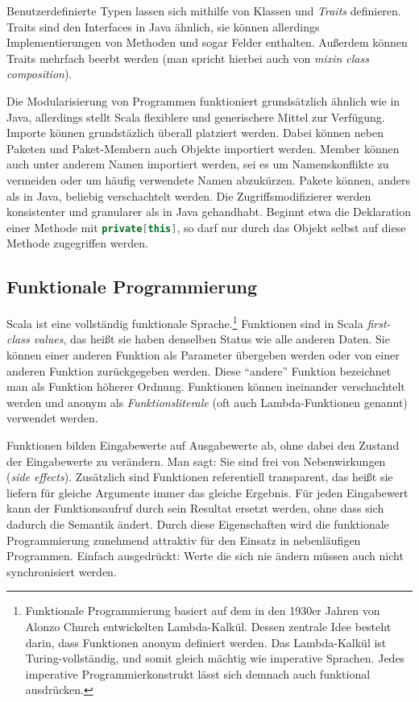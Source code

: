 \documentclass[a4paper, 12pt, hidelinks, listof=totoc, listoftables=totoc, bibliography=totoc]{scrreprt}
\newcommand{\scala}[1]{\lstinline[language=Scala, style=inline]|#1|}
\begin{document}
Benutzerdefinierte Typen lassen sich mithilfe von Klassen und \textit{Traits} definieren. Traits sind den Interfaces in Java ähnlich, sie können allerdings Implementierungen von Methoden und sogar Felder enthalten. Außerdem können Traits mehrfach beerbt werden (man spricht hierbei auch von \textit{mixin class composition}).

Die Modularisierung von Programmen funktioniert grundsätzlich ähnlich wie in Java, allerdings stellt Scala flexiblere und generischere Mittel zur Verfügung. Importe können grundstäzlich überall platziert werden. Dabei können neben Paketen und Paket-Membern auch Objekte importiert werden. Member können auch unter anderem Namen importiert werden, sei es um Namenskonflikte zu vermeiden oder um häufig verwendete Namen abzukürzen.
Pakete können, anders als in Java, beliebig verschachtelt werden. Die Zugriffsmodifizierer werden konsistenter und granularer als in Java gehandhabt. Beginnt etwa die Deklaration einer Methode mit \scala{private[this]}, so darf nur durch das Objekt selbst auf diese Methode zugegriffen werden.\cite[S. 9 f., S. 233 ff.]{odersky2008.PIS}\cite{scala-lang.ATS}

\subsection{Funktionale Programmierung}


Scala ist eine vollständig funktionale Sprache.\footnote{Funktionale Programmierung basiert auf dem in den 1930er Jahren von Alonzo Church entwickelten Lambda-Kalkül. Dessen zentrale Idee besteht darin, dass Funktionen anonym definiert werden. Das Lambda-Kalkül ist Turing-vollständig, und somit gleich mächtig wie imperative Sprachen. Jedes imperative Programmierkonstrukt lässt sich demnach auch funktional ausdrücken.} Funktionen sind in Scala \textit{first-class values}, das heißt sie haben denselben Status wie alle anderen Daten. Sie können einer anderen Funktion als Parameter übergeben werden oder von einer anderen Funktion zurückgegeben werden. Diese "`andere"' Funktion bezeichnet man als Funktion höherer Ordnung. Funktionen können ineinander verschachtelt werden und anonym als \textit{Funktionsliterale} (oft auch Lambda-Funktionen genannt) verwendet werden.

Funktionen bilden Eingabewerte auf Ausgabewerte ab, ohne dabei den Zustand der Eingabewerte zu verändern. Man sagt: Sie sind frei von Nebenwirkungen (\textit{side effects}). Zusätzlich sind Funktionen referentiell transparent, das heißt sie liefern für gleiche Argumente immer das gleiche Ergebnis. Für jeden Eingabewert kann der Funktionsaufruf durch sein Resultat ersetzt werden, ohne dass sich dadurch die Semantik ändert. Durch diese Eigenschaften wird die funktionale Programmierung zunehmend attraktiv für den Einsatz in nebenläufigen Programmen. Einfach ausgedrückt: Werte die sich nie ändern müssen auch nicht synchronisiert werden.
\end{document}
